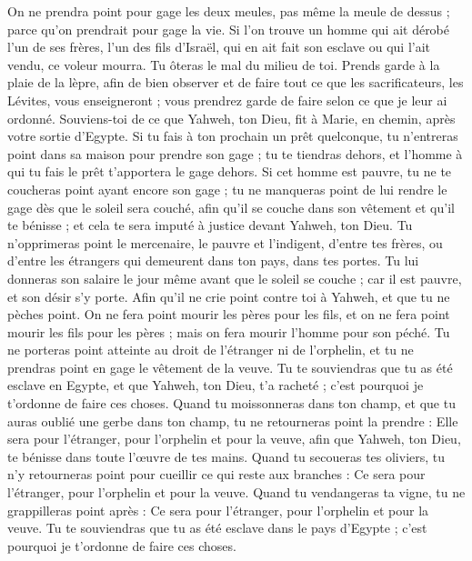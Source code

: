 \begin{multicols}{2}
On ne prendra point pour gage les deux meules, pas même la meule de dessus ; parce qu'on prendrait pour gage la vie.
Si l'on trouve un homme qui ait dérobé l'un de ses frères, l'un des fils d'Israël, qui en ait fait son esclave ou qui l'ait vendu, ce voleur mourra. Tu ôteras le mal du milieu de toi.
Prends garde à la plaie de la lèpre, afin de bien observer et de faire tout ce que les sacrificateurs, les Lévites, vous enseigneront ; vous prendrez garde de faire selon ce que je leur ai ordonné.
Souviens-toi de ce que Yahweh, ton Dieu, fit à Marie, en chemin, après votre sortie d'Egypte.
Si tu fais à ton prochain un prêt quelconque, tu n'entreras point dans sa maison pour prendre son gage ;
tu te tiendras dehors, et l'homme à qui tu fais le prêt t'apportera le gage dehors.
Si cet homme est pauvre, tu ne te coucheras point ayant encore son gage ;
tu ne manqueras point de lui rendre le gage dès que le soleil sera couché, afin qu'il se couche dans son vêtement et qu'il te bénisse ; et cela te sera imputé à justice devant Yahweh, ton Dieu.
Tu n'opprimeras point le mercenaire, le pauvre et l'indigent, d'entre tes frères, ou d'entre les étrangers qui demeurent dans ton pays, dans tes portes.
Tu lui donneras son salaire le jour même avant que le soleil se couche ; car il est pauvre, et son désir s'y porte. Afin qu'il ne crie point contre toi à Yahweh, et que tu ne pèches point.
On ne fera point mourir les pères pour les fils, et on ne fera point mourir les fils pour les pères ; mais on fera mourir l'homme pour son péché.
Tu ne porteras point atteinte au droit de l'étranger ni de l'orphelin, et tu ne prendras point en gage le vêtement de la veuve.
Tu te souviendras que tu as été esclave en Egypte, et que Yahweh, ton Dieu, t'a racheté ; c'est pourquoi je t'ordonne de faire ces choses.
Quand tu moissonneras dans ton champ, et que tu auras oublié une gerbe dans ton champ, tu ne retourneras point la prendre : Elle sera pour l'étranger, pour l'orphelin et pour la veuve, afin que Yahweh, ton Dieu, te bénisse dans toute l'œuvre de tes mains.
Quand tu secoueras tes oliviers, tu n'y retourneras point pour cueillir ce qui reste aux branches : Ce sera pour l'étranger, pour l'orphelin et pour la veuve.
Quand tu vendangeras ta vigne, tu ne grappilleras point après : Ce sera pour l'étranger, pour l'orphelin et pour la veuve.
Tu te souviendras que tu as été esclave dans le pays d'Egypte ; c'est pourquoi je t'ordonne de faire ces choses.

\end{multicols}
